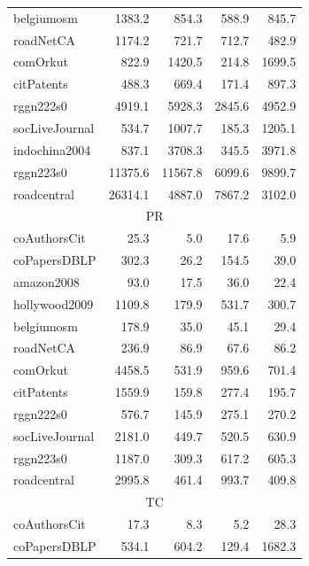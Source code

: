 \begin{table}[tbp]
\begin{center}
{\begin{tabular}{|l|r|r|r|r|}
        \rowcolor{black!10} belgiumosm&1383.2&854.3&588.9&845.7\\
        \rowcolor{black!2 } roadNetCA&1174.2&721.7&712.7&482.9\\
        \rowcolor{black!10} comOrkut&822.9&1420.5&214.8&1699.5\\
        \rowcolor{black!2 } citPatents&488.3&669.4&171.4&897.3\\
        \rowcolor{black!10} rggn222s0&4919.1&5928.3&2845.6&4952.9\\
        \rowcolor{black!2 } socLiveJournal&534.7&1007.7&185.3&1205.1\\
        \rowcolor{black!10} indochina2004&837.1&3708.3&345.5&3971.8\\
        \rowcolor{black!2 } rggn223s0&11375.6&11567.8&6099.6&9899.7\\
        \rowcolor{black!10} roadcentral&26314.1&4887.0&7867.2&3102.0\\
        \hline
        \hline
        \multicolumn{5}{|c|}{PR} \\
        \hline
        \rowcolor{black!10} coAuthorsCit&25.3&5.0&17.6&5.9\\
        \rowcolor{black!2 } coPapersDBLP&302.3&26.2&154.5&39.0\\
        \rowcolor{black!10} amazon2008&93.0&17.5&36.0&22.4\\
        \rowcolor{black!2 } hollywood2009&1109.8&179.9&531.7&300.7\\
        \rowcolor{black!10} belgiumosm&178.9&35.0&45.1&29.4\\
        \rowcolor{black!2 } roadNetCA&236.9&86.9&67.6&86.2\\
        \rowcolor{black!10} comOrkut&4458.5&531.9&959.6&701.4\\
        \rowcolor{black!2 } citPatents&1559.9&159.8&277.4&195.7\\
        \rowcolor{black!10} rggn222s0&576.7&145.9&275.1&270.2\\
        \rowcolor{black!2 } socLiveJournal&2181.0&449.7&520.5&630.9\\
        \rowcolor{black!10} rggn223s0&1187.0&309.3&617.2&605.3\\
        \rowcolor{black!2 } roadcentral&2995.8&461.4&993.7&409.8\\
        \hline
        \hline
        \multicolumn{5}{|c|}{TC} \\
        \hline
        \rowcolor{black!10} coAuthorsCit&17.3&8.3&5.2&28.3\\
        \rowcolor{black!2 } coPapersDBLP&534.1&604.2&129.4&1682.3\\

\end{tabular}}
\end{center}
\end{table}
